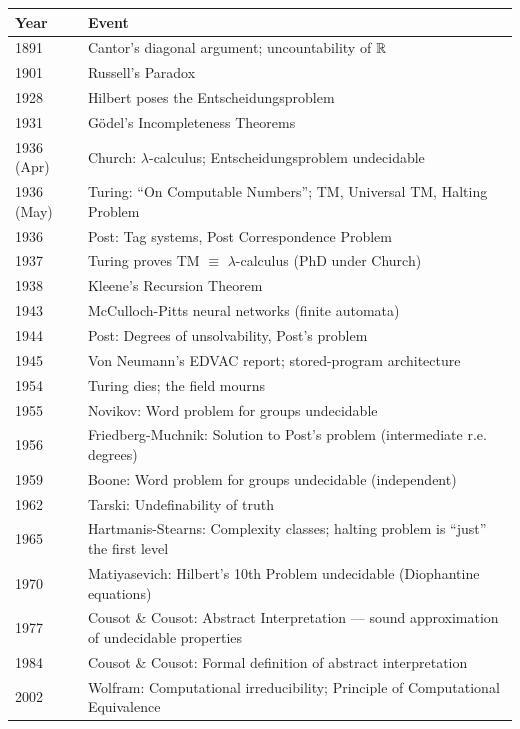 \begin{tabularx}{\linewidth}{|l|X|}
\hline
\textbf{Year} & \textbf{Event} \\ \hline
1891 & Cantor's diagonal argument; uncountability of $\mathbb{R}$ \\ \hline
1901 & Russell's Paradox \\ \hline
1928 & Hilbert poses the Entscheidungsproblem \\ \hline
1931 & G\"odel's Incompleteness Theorems \\ \hline
1936 (Apr) & Church: $\lambda$-calculus; Entscheidungsproblem undecidable \\ \hline
1936 (May) & Turing: ``On Computable Numbers''; TM, Universal TM, Halting Problem \\ \hline
1936 & Post: Tag systems, Post Correspondence Problem \\ \hline
1937 & Turing proves TM $\equiv$ $\lambda$-calculus (PhD under Church) \\ \hline
1938 & Kleene's Recursion Theorem \\ \hline
1943 & McCulloch-Pitts neural networks (finite automata) \\ \hline
1944 & Post: Degrees of unsolvability, Post's problem \\ \hline
1945 & Von Neumann's EDVAC report; stored-program architecture \\ \hline
1954 & Turing dies; the field mourns \\ \hline
1955 & Novikov: Word problem for groups undecidable \\ \hline
1956 & Friedberg-Muchnik: Solution to Post's problem (intermediate r.e. degrees) \\ \hline
1959 & Boone: Word problem for groups undecidable (independent) \\ \hline
1962 & Tarski: Undefinability of truth \\ \hline
1965 & Hartmanis-Stearns: Complexity classes; halting problem is ``just'' the first level \\ \hline
1970 & Matiyasevich: Hilbert's 10th Problem undecidable (Diophantine equations) \\ \hline
1977 & Cousot \& Cousot: Abstract Interpretation — sound approximation of undecidable properties \\ \hline
1984 & Cousot \& Cousot: Formal definition of abstract interpretation \\ \hline
2002 & Wolfram: Computational irreducibility; Principle of Computational Equivalence \\ \hline

\end{tabularx}
